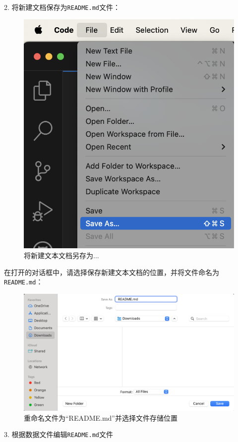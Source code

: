 \documentclass[]{ctexbook}
\theoremstyle{definition}
\theoremstyle{definition}
\theoremstyle{definition}
\theoremstyle{definition}
\theoremstyle{remark}
\begin{document}
2. 将新建文档保存为\texttt{README.md}文件：

\begin{figure}

{\centering \includegraphics[width=0.7\linewidth]{img/vscode/mkreadme_saveas1} 

}

\caption{将新建文本文档另存为...}\label{fig:mkreadme-saveas1}
\end{figure}

在打开的对话框中，请选择保存新建文本文档的位置，并将文件命名为\texttt{README.md}：

\begin{figure}

{\centering \includegraphics[width=0.8\linewidth]{img/vscode/mkreadme_saveas2} 

}

\caption{重命名文件为“README.md”并选择文件存储位置}\label{fig:mkreadme-saveas2}
\end{figure}

3. 根据数据文件编辑\texttt{README.md}文件
\end{document}
